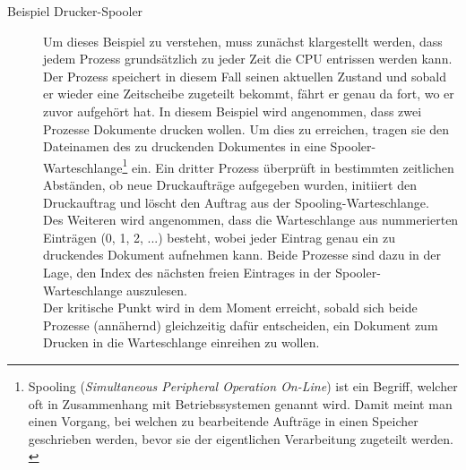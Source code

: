 				\begin{description}
					\item[Beispiel Drucker-Spooler]
	
						Um dieses Beispiel zu verstehen, muss zunächst klargestellt werden, dass jedem Prozess grundsätzlich zu jeder Zeit die CPU entrissen werden kann. Der Prozess speichert in diesem Fall seinen aktuellen Zustand und sobald er wieder eine Zeitscheibe zugeteilt bekommt, fährt er genau da fort, wo er zuvor aufgehört hat.
						In diesem Beispiel wird angenommen, dass zwei Prozesse Dokumente drucken wollen. Um dies zu erreichen, tragen sie den Dateinamen des zu druckenden Dokumentes in eine Spooler-Warteschlange\footnote{Spooling (\textit{Simultaneous Peripheral Operation On-Line}) ist ein Begriff, welcher oft in Zusammenhang mit Betriebssystemen genannt wird. Damit meint man einen Vorgang, bei welchen zu bearbeitende Aufträge in einen Speicher geschrieben werden, bevor sie der eigentlichen Verarbeitung zugeteilt werden. \cite{SpoolingWikipedia}} ein. Ein dritter Prozess überprüft in bestimmten zeitlichen Abständen, ob neue Druckaufträge aufgegeben wurden, initiiert den Druckauftrag und löscht den Auftrag aus der Spooling-Warteschlange.\\
						Des Weiteren wird angenommen, dass die Warteschlange aus nummerierten Einträgen (0, 1, 2, ...) besteht, wobei jeder Eintrag genau ein zu druckendes Dokument aufnehmen kann. Beide Prozesse sind dazu in der Lage, den Index des nächsten freien Eintrages in der Spooler-Warteschlange auszulesen.\\
						Der kritische Punkt wird in dem Moment erreicht, sobald sich beide Prozesse (annähernd) gleichzeitig dafür entscheiden, ein Dokument zum Drucken in die Warteschlange einreihen zu wollen.\\

\end{description}

